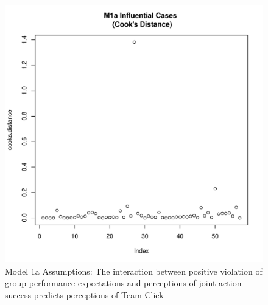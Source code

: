 \begin{figure}[htbp]
    \includegraphics[scale =.4]{images/TEM1aCooksD.pdf}
    \caption{Model 1a Assumptions: The interaction between positive violation of group performance expectations and perceptions of joint action success predicts perceptions of Team Click}
    \label{fig:M1aAssumptions}
\end{figure}


